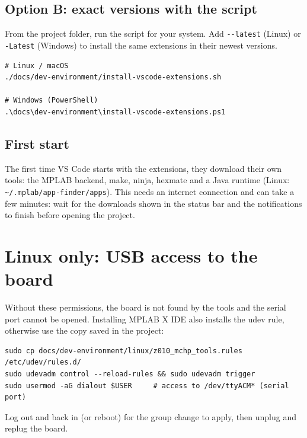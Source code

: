 \documentclass[
  11pt,
  letterpaper,
  oneside,
  DIV=13,               %
  parskip=half,          %
  headings=normal,
  chapterprefix=false,
  toc=listof,
  numbers=noenddot,
]{scrbook}
\begin{document}
\subsection{Option B: exact versions with the script}

From the project folder, run the script for your system. Add \texttt{-{}-\allowbreak{}latest} (Linux) or \texttt{-\allowbreak{}Latest} (Windows) to install the same extensions in their newest versions.
\begin{lstlisting}[style=shell]
# Linux / macOS
./docs/dev-environment/install-vscode-extensions.sh

# Windows (PowerShell)
.\docs\dev-environment\install-vscode-extensions.ps1
\end{lstlisting}

\subsection{First start}

The first time VS Code starts with the extensions, they download their own tools: the MPLAB backend, make, ninja, hexmate and a Java runtime (Linux: \texttt{\textasciitilde{}/\allowbreak{}.\allowbreak{}mplab/\allowbreak{}app-\allowbreak{}finder/\allowbreak{}apps}). This needs an internet connection and can take a few minutes: wait for the downloads shown in the status bar and the notifications to finish before opening the project.

\section{Linux only: USB access to the board}\label{sec-env-usb}

Without these permissions, the board is not found by the tools and the serial port cannot be opened. Installing MPLAB X IDE also installs the udev rule, otherwise use the copy saved in the project:
\begin{lstlisting}[style=shell]
sudo cp docs/dev-environment/linux/z010_mchp_tools.rules /etc/udev/rules.d/
sudo udevadm control --reload-rules && sudo udevadm trigger
sudo usermod -aG dialout $USER     # access to /dev/ttyACM* (serial port)
\end{lstlisting}

Log out and back in (or reboot) for the group change to apply, then unplug and replug the board.
\end{document}
